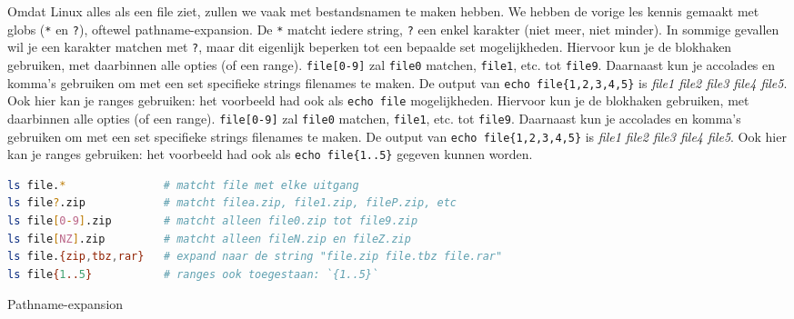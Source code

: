 Omdat Linux alles als een file ziet, zullen we vaak met bestandsnamen te maken hebben. We hebben de vorige les kennis gemaakt met globs (\texttt{*} en \texttt{?}), oftewel pathname-expansion. De \texttt{*} matcht iedere string, \texttt{?} een enkel karakter (niet meer, niet minder). In sommige gevallen wil je een karakter matchen met \texttt{?}, maar dit eigenlijk beperken tot een bepaalde set mogelijkheden. Hiervoor kun je de blokhaken gebruiken, met daarbinnen alle opties (of een range). \texttt{file{[}0-9{]}} zal \texttt{file0} matchen, \texttt{file1}, etc. tot \texttt{file9}. Daarnaast kun je accolades en komma's gebruiken om met een set specifieke strings filenames te maken. De output van \texttt{echo\ file\{1,2,3,4,5\}} is \emph{file1 file2 file3 file4 file5}. Ook hier kan je ranges gebruiken: het voorbeeld had ook als \texttt{echo\ file} mogelijkheden. Hiervoor kun je de blokhaken gebruiken, met daarbinnen alle opties (of een range). \texttt{file{[}0-9{]}} zal \texttt{file0} matchen, \texttt{file1}, etc. tot \texttt{file9}. Daarnaast kun je accolades en komma's gebruiken om met een set specifieke strings filenames te maken. De output van \texttt{echo\ file\{1,2,3,4,5\}} is \emph{file1 file2 file3 file4 file5}. Ook hier kan je ranges gebruiken: het voorbeeld had ook als \texttt{echo\ file\{1..5\}} gegeven kunnen worden.

\begin{listing}
\begin{lstlisting}[language=bash]
ls file.*               # matcht file met elke uitgang
ls file?.zip            # matcht filea.zip, file1.zip, fileP.zip, etc
ls file[0-9].zip        # matcht alleen file0.zip tot file9.zip
ls file[NZ].zip         # matcht alleen fileN.zip en fileZ.zip
ls file.{zip,tbz,rar}   # expand naar de string "file.zip file.tbz file.rar"
ls file{1..5}           # ranges ook toegestaan: `{1..5}`
\end{lstlisting}
\caption{Pathname-expansion}
\end{listing}

